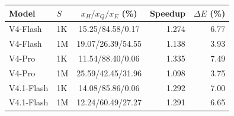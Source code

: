 \begin{tabular*}{\linewidth}{@{\extracolsep{\fill}}llcrr@{}}\toprule
Model & $S$ & $x_H/x_Q/x_E$ (\%) & Speedup & $\Delta E$ (\%) \\\midrule
V4-Flash & 1K & 15.25/84.58/0.17 & 1.274 & 6.77 \\
V4-Flash & 1M & 19.07/26.39/54.55 & 1.138 & 3.93 \\
V4-Pro & 1K & 11.54/88.40/0.06 & 1.335 & 7.49 \\
V4-Pro & 1M & 25.59/42.45/31.96 & 1.098 & 3.75 \\
V4.1-Flash & 1K & 14.08/85.86/0.06 & 1.292 & 7.00 \\
V4.1-Flash & 1M & 12.24/60.49/27.27 & 1.291 & 6.65 \\
\bottomrule\end{tabular*}

